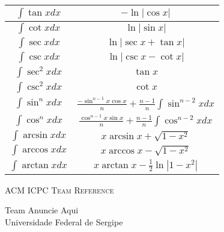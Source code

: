 \documentclass[a4paper]{amsart}
\begin{document}
\begin{multicols}{2}
      \begin{tabular}{|c|c|}
        \hline 
        $\int \tan x dx$ & $-\ln |\cos x|$ \\ \hline
        $\int \cot x dx$ & $\ln |\sin x|$ \\ \hline
        $\int \sec x dx$ & $\ln |\sec x + \tan x|$ \\ \hline
        $\int \csc x dx$ & $\ln |\csc x - \cot x|$ \\ \hline
        $\int \sec^2 x dx$ & $\tan x$ \\ \hline
        $\int \csc^2 x dx$ & $\cot x$ \\ \hline
        $\int \sin^n x dx$ & $\frac{-\sin^{n-1} x \cos x}{n} + \frac{n-1}{n}\int \sin^{n-2}x dx$ \\ \hline
        $\int \cos^n x dx$ & $\frac{\cos^{n-1} x \sin x}{n} + \frac{n-1}{n}\int \cos^{n-2}x dx$ \\ \hline        
        $\int \arcsin x dx$ & $x \arcsin x + \sqrt{1 - x^2}$ \\ \hline
        $\int \arccos x dx$ & $x \arccos x - \sqrt{1 - x^2}$ \\ \hline
        $\int \arctan x dx$ & $x \arctan x - \frac{1}{2} \ln |1 - x^2|$ \\ \hline
      \end{tabular}
  \end{multicols}

  \enlargethispage*{\baselineskip}
  \pagebreak

  \begin{center}
    \Huge\textsc{ACM ICPC Team Reference}

    \vspace{0.45cm}

    \huge Team Anuncie Aqui \\ Universidade Federal de Sergipe

    \vspace{0.45cm}

  \end{center}

  \begin{multicols}{2}
    \tableofcontents
  \end{multicols}
\end{document}
